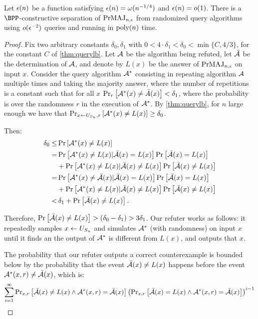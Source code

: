 \begin{theorem}
\label{thm:qarandomizedcs}
Let $\epsilon(n)$ be a function satisfying $\epsilon(n) = \omega(n^{-1/4})$ and $\epsilon(n) = o(1)$. 
There is a $\BPP$-constructive separation of $\mathrm{PrMAJ}_{n, \epsilon}$ from randomized query algorithms
using $o(\epsilon^{-2})$ queries and running in $\text{poly}(n)$ time. 
\end{theorem}
\begin{proof}
    Fix two arbitrary constants $\delta_0, \delta_1$ with $0 < 4 \cdot \delta_1 < \delta_0 < \min\{C, 4/3\}$, 
    for the constant $C$ of \cref{thm:querylb}.
    Let $\mathcal{A}$ be the algorithm being refuted, let $\bar{\mathcal{A}}$ be the determination
    of $\mathcal{A}$, and denote by $L(x)$ be the answer of $\mathrm{PrMAJ}_{n, \epsilon}$ on input $x$. 
    Consider the query algorithm $\mathcal{A}^*$ consisting in repeating algorithm $\mathcal{A}$  multiple times and 
    taking the majority answer, where the number of repetitions is a constant such
    that for all $x$ $\text{Pr}_{r}\left[\mathcal{A}^*(x) \neq \bar{A}(x)\right] < \delta_1$, where the 
    probability is over the randomness $r$ in the execution of $\mathcal{A}^*$. 
    By \cref{thm:querylb},
    for $n$ large enough we have that $\text{Pr}_{x \leftarrow U_{S_n}, r}\left[\mathcal{A}^*(x) \neq L(x)\right] \geq \delta_0$.

    Then:
    \begin{align*}
    \delta_0  \le & \,  \text{Pr}\left[\mathcal{A}^*(x) \neq L(x)\right] \\
          = & \,  \text{Pr}\left[\mathcal{A}^*(x) \neq L(x) | \bar{\mathcal{A}}(x) = L(x)\right] \text{Pr}\left[\bar{\mathcal{A}}(x) = L(x)\right] \\
         &  + \text{Pr}\left[\mathcal{A}^*(x) \neq L(x) | \bar{\mathcal{A}}(x) \neq L(x)\right] \text{Pr}\left[\bar{\mathcal{A}}(x) \neq L(x)\right] \\
         = & \,  \text{Pr}\left[\mathcal{A}^*(x) \neq \bar{\mathcal{A}}(x) | \bar{\mathcal{A}}(x) = L(x)\right] \text{Pr}\left[\bar{\mathcal{A}}(x) = L(x)\right] \\
         &  + \text{Pr}\left[\mathcal{A}^*(x) \neq L(x) | \bar{\mathcal{A}}(x) \neq L(x)\right] \text{Pr}\left[\bar{\mathcal{A}}(x) \neq L(x)\right] \\
         < & \, \delta_1 + \text{Pr}\left[\bar{\mathcal{A}}(x) \neq L(x)\right].
    \end{align*}

    Therefore, $\text{Pr}\left[\bar{\mathcal{A}}(x) \neq L(x)\right] > (\delta_0 - \delta_1) > 3 \delta_1$. Our refuter works
    as follows: it repeatedly samples $x \leftarrow U_{S_n}$ and simulates $\mathcal{A}^*$ (with randomness) on input $x$ until it finds an
    the output of $\mathcal{A}^*$ is different from $L(x)$, and outputs that $x$. 
    
    The probability that our refuter outputs a correct counterexample is bounded below by the probability 
    that the event $\bar{\mathcal{A}}(x) \neq L(x)$
    happens before the event $\mathcal{A}^*(x, r) \neq \bar{\mathcal{A}}(x)$, which is:
    \begin{equation}
        \label{eq:prbound}
        \sum_{i=1}^{\infty} \text{Pr}_{x,r}\left[\bar{\mathcal{A}}(x) \neq L(x) \wedge \mathcal{A}^*(x, r) = \bar{\mathcal{A}}(x)\right] \left(\text{Pr}_{x,r}\left[\bar{\mathcal{A}}(x) = L(x) \wedge \mathcal{A}^*(x, r) = \bar{\mathcal{A}}(x)\right]  \right)^{i-1}
    \end{equation}


\end{proof}
